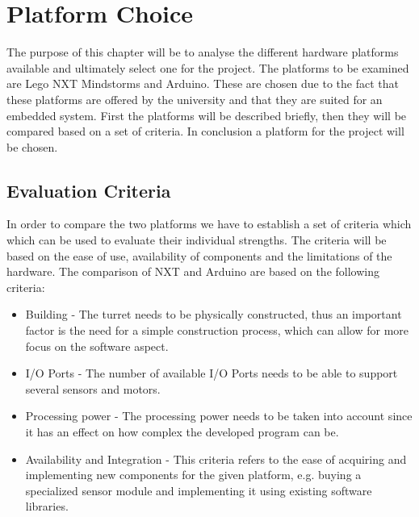 \chapter{Platform Choice}\label{PlatformC}
The purpose of this chapter will be to analyse the different hardware platforms available
and ultimately select one for the project. The platforms to be examined are Lego
NXT Mindstorms and Arduino. These are chosen due to the fact that these
platforms are offered by the university and that they are suited for an embedded system.
First the platforms will be described briefly, then they will be
compared based on a set of criteria. In conclusion a platform for the project
will be chosen.

\section{Evaluation Criteria}\label{EvalCrit}
In order to compare the two platforms we have to establish a set of criteria
which which can be used to evaluate their individual strengths. The criteria
will be based on the ease of use, availability of components and the limitations
of the hardware. The comparison of NXT and Arduino are based on the following
criteria:

\begin{itemize}
  \item Building - The turret needs to be physically constructed, thus an
  important factor is the need for a simple construction process, which can
  allow for more focus on the software aspect.
  \item I/O Ports - The number of available I/O Ports needs to be able to
  support several sensors and motors.
  \item Processing power - The processing power needs to be taken into account
  since it has an effect on how complex the developed program can be.
  \item Availability and Integration - This criteria refers to the ease of
  acquiring and implementing new components for the given platform, e.g. buying
  a specialized sensor module and implementing it using existing software
  libraries.
\end{itemize}


